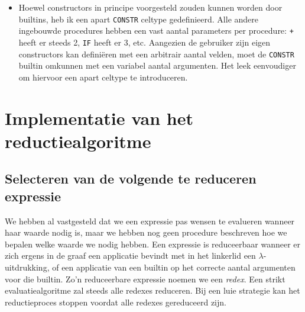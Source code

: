 \documentclass[a4paper,10pt]{article}
\begin{document}
\begin{itemize}
  \paragraph{}
  Behalve operatoren zijn er ook enkele constanten die als builtins worden ge{\"i}mplementeerd.
  Deze kunnen gezien worden als operatoren met 0 argumenten.
  Een voorbeeld hiervan is de \texttt{FAIL} constante, die gebruikt wordt om een gefaalde poging tot pattern matching te indiceren.
\item
  Hoewel constructors in principe voorgesteld zouden kunnen worden door builtins, heb ik een apart \texttt{CONSTR} celtype gedefinieerd.
  Alle andere ingebouwde procedures hebben een vast aantal parameters per procedure: \texttt{+} heeft er steeds 2, \texttt{IF} heeft er 3, etc.
  Aangezien de gebruiker zijn eigen constructors kan defini{\"e}ren met een arbitrair aantal velden, moet de \texttt{CONSTR} builtin omkunnen met een variabel aantal argumenten.
  Het leek eenvoudiger om hiervoor een apart celtype te introduceren.
\end{itemize}

\section{Implementatie van het reductiealgoritme}
\subsection{Selecteren van de volgende te reduceren expressie}
We hebben al vastgesteld dat we een expressie pas wensen te evalueren wanneer haar waarde nodig is, maar we hebben nog geen procedure beschreven hoe we bepalen welke waarde we nodig hebben.
Een expressie is reduceerbaar wanneer er zich ergens in de graaf een applicatie bevindt met in het linkerlid een $\lambda$-uitdrukking, of een applicatie van een builtin op het correcte aantal argumenten voor die builtin.
Zo'n reduceerbare expressie noemen we een \emph{redex}.
Een strikt evaluatiealgoritme zal steeds alle redexes reduceren.
Bij een luie strategie kan het reductieproces stoppen voordat alle redexes gereduceerd zijn.
\paragraph{}
\end{document}
